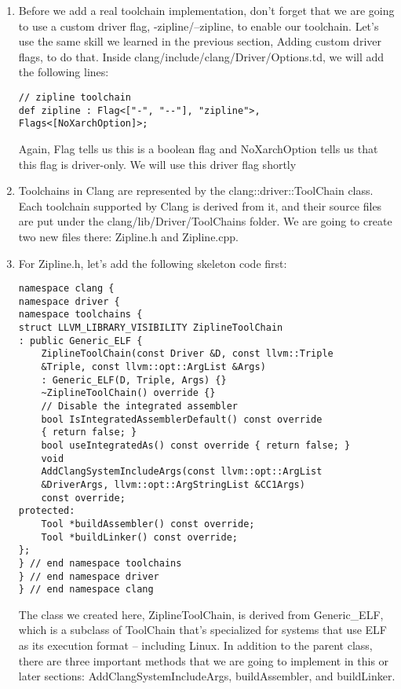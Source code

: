 \begin{enumerate}
\item Before we add a real toolchain implementation, don't forget that we are going to use a custom driver flag, -zipline/--zipline, to enable our toolchain. Let's use the same skill we learned in the previous section, Adding custom driver flags, to do that. Inside clang/include/clang/Driver/Options.td, we will add the following lines:

\begin{lstlisting}[style=styleJavaScript]
// zipline toolchain
def zipline : Flag<["-", "--"], "zipline">,
Flags<[NoXarchOption]>;
\end{lstlisting}

Again, Flag tells us this is a boolean flag and NoXarchOption tells us that this flag is driver-only. We will use this driver flag shortly

\item Toolchains in Clang are represented by the clang::driver::ToolChain class. Each toolchain supported by Clang is derived from it, and their source files are put under the clang/lib/Driver/ToolChains folder. We are going to create two new files there: Zipline.h and Zipline.cpp.

\item For Zipline.h, let's add the following skeleton code first:
\begin{lstlisting}[style=styleCXX]
namespace clang {
namespace driver {
namespace toolchains {
struct LLVM_LIBRARY_VISIBILITY ZiplineToolChain
: public Generic_ELF {
	ZiplineToolChain(const Driver &D, const llvm::Triple
	&Triple, const llvm::opt::ArgList &Args)
	: Generic_ELF(D, Triple, Args) {}
	~ZiplineToolChain() override {}
	// Disable the integrated assembler
	bool IsIntegratedAssemblerDefault() const override
	{ return false; }
	bool useIntegratedAs() const override { return false; }
	void
	AddClangSystemIncludeArgs(const llvm::opt::ArgList
	&DriverArgs, llvm::opt::ArgStringList &CC1Args)
	const override;
protected:
	Tool *buildAssembler() const override;
	Tool *buildLinker() const override;
};
} // end namespace toolchains
} // end namespace driver
} // end namespace clang
\end{lstlisting}

The class we created here, ZiplineToolChain, is derived from Generic\_ELF, which is a subclass of ToolChain that's specialized for systems that use ELF as its execution format – including Linux. In addition to the parent class, there are three important methods that we are going to implement in this or later sections: AddClangSystemIncludeArgs, buildAssembler, and buildLinker.


\end{enumerate}
